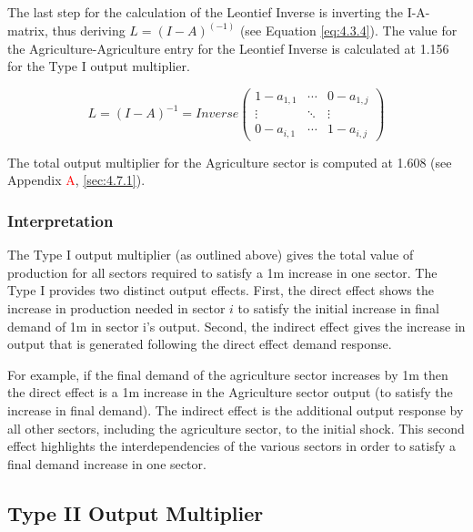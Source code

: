 \begin{doublespacing}
The last step for the calculation of the Leontief Inverse is inverting the I-A-matrix, thus deriving  $L=(I-A)^{(-1)}$ (see Equation \ref{eq:4.3.4}). The value for the Agriculture-Agriculture entry for the Leontief Inverse is calculated at 1.156 for the Type I output multiplier.

  \bigskip   \begin{singlespacing}  \begin{equation} \label{eq:4.3.4}
  L=(I-A)^{-1} = Inverse  \begin{pmatrix}
    1-a_{1,1} & \cdots & 0-a_{1,j} \\
    \vdots & \ddots & \vdots  \\
    0-a_{i,1} & \cdots & 1-a_{i,j}
  \end{pmatrix}  \end{equation} \end{singlespacing}  \bigskip

The total output multiplier for the Agriculture sector is computed at 1.608 (see Appendix \textcolor{red}A, \ref{sec:4.7.1}).

\subsubsection{Interpretation}

The Type I output multiplier (as outlined above) gives the total value of production for all sectors required to satisfy a \textsterling1m increase in one sector. The Type I provides two distinct output effects. First, the direct effect shows the increase in production needed in sector $i$ to satisfy the initial increase in final demand of \textsterling1m in sector i's output. Second, the indirect effect gives the increase in output that is generated following the direct effect demand response.

\bigskip

For example, if the final demand of the agriculture sector increases by \textsterling1m then the direct effect is a \textsterling1m increase in the Agriculture sector output (to satisfy the increase in final demand). The indirect effect is the additional output response by all other sectors, including the agriculture sector, to the initial shock. This second effect highlights the interdependencies of the various sectors in order to satisfy a final demand increase in one sector.

\subsection{Type II Output Multiplier}
\label{sec:4.3.2}


\end{doublespacing}
